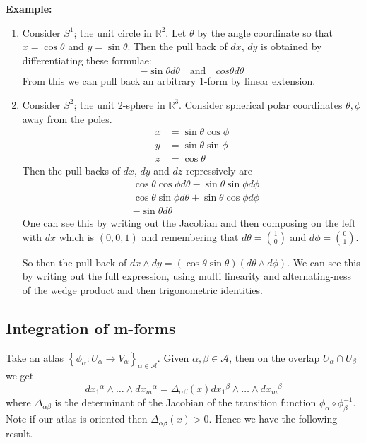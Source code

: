 \documentclass[11pt]{article}
\newcommand{\R}{\mathbb{R}}
\newenvironment{eg}
{\begin{mdframed}[backgroundcolor=mylg,roundcorner=5pt,linewidth=0pt]\setlength{\parindent}{0pt}\bfseries{Example:}\normalfont}
	{\end{mdframed}}
\begin{document}
\begin{eg}
	\begin{enumerate}
		\item Consider $S^1$; the unit circle in $\R^2$.
			Let $\theta$ by the angle coordinate so that $x=\cos\theta$ and $y=\sin\theta$.
			Then the pull back of $dx$, $dy$ is obtained by differentiating these formulae:
			\[
				-\sin\theta d\theta \quad\text{and}\quad cos\theta d\theta
			\]
			From this we can pull back an arbitrary 1-form by linear extension.
		\item Consider $S^2$; the unit 2-sphere in $\R^3$.
			Consider spherical polar coordinates $\theta, \phi$ away from the poles.
			\begin{align*}
				x &= \sin\theta\cos\phi \\
				y &= \sin\theta\sin\phi \\
				z &= \cos\theta
			\end{align*}
			Then the pull backs of $dx$, $dy$ and $dz$ repressively are
			\begin{align*}
				&\cos\theta\cos\phi d\theta - \sin\theta\sin\phi d\phi\\
				&\cos\theta\sin\phi d\theta + \sin\theta\cos\phi d\phi \\
				& -\sin\theta d\theta
			\end{align*}
			One can see this by writing out the Jacobian and then composing on the left with $dx$ which is $(0 , 0, 1)$ and remembering that $d\theta=\binom{1}{0}$ and $d\phi=\binom{0}{1}$.

			So then the pull back of $dx \wedge dy = (\cos\theta\sin\theta)(d\theta \wedge d\phi)$.
			We can see this by writing out the full expression, using multi linearity and alternating-ness of the wedge product and then trigonometric identities.
	\end{enumerate}
\end{eg}

\subsection{Integration of m-forms}
Take an atlas $\left\{ \phi_\alpha: U_\alpha \to V_\alpha\right\}_{\alpha\in\mathcal{A}}$.
Given $\alpha, \beta\in\mathcal{A}$, then on the overlap $U_\alpha \cap U_\beta$ we get
\[
	d{x_1}^\alpha \wedge \dots \wedge d{x_m}^\alpha = \Delta_{\alpha\beta}(x) d{x_1}^\beta \wedge \dots \wedge d{x_m}^\beta
\]
where $\Delta_{\alpha\beta}$ is the determinant of the Jacobian of the transition function $\phi_\alpha \circ \phi_\beta^{-1}$.
Note if our atlas is oriented then $\Delta_{\alpha\beta}(x) > 0$.
Hence we have the following result.
\end{document}
